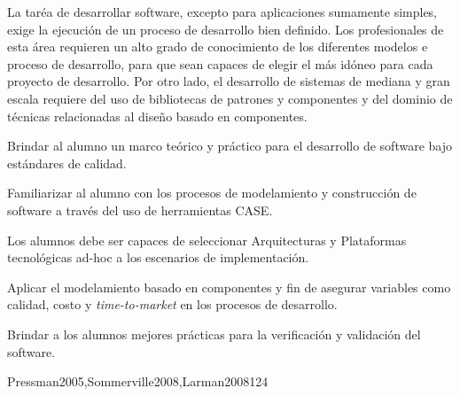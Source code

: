 \begin{syllabus}


\begin{justification}
La taréa de desarrollar software, excepto para aplicaciones sumamente simples, exige la ejecución de un proceso de desarrollo bien definido. 
Los profesionales de esta área requieren un alto grado de conocimiento de los diferentes modelos e proceso de desarrollo, 
para que sean capaces de elegir el más idóneo para cada proyecto de desarrollo. Por otro lado, el desarrollo de sistemas 
de mediana y gran escala requiere del uso de bibliotecas de patrones y componentes y del dominio de técnicas relacionadas al 
diseño basado en componentes.
\end{justification}

\begin{goals}
\item Brindar al alumno un marco teórico y práctico para el desarrollo de software bajo estándares de calidad.
\item Familiarizar al alumno con los procesos de modelamiento y construcción de software a través del uso de herramientas CASE.
\item Los alumnos debe ser capaces de seleccionar Arquitecturas y Plataformas tecnológicas ad-hoc a los escenarios de implementación.
\item Aplicar el modelamiento basado en componentes y fin de asegurar variables como calidad, costo  y \textit{time-to-market} en los procesos de desarrollo.
\item Brindar a los alumnos mejores prácticas para la verificación y validación del software.
\end{goals}

\begin{outcomes}
\end{outcomes}

\begin{unit}{\SESoftwareDesignDef}{Pressman2005,Sommerville2008,Larman2008}{12}{4}
    \SESoftwareDesignAllTopics
    \SESoftwareDesignAllObjectives
\end{unit}


\end{syllabus}
